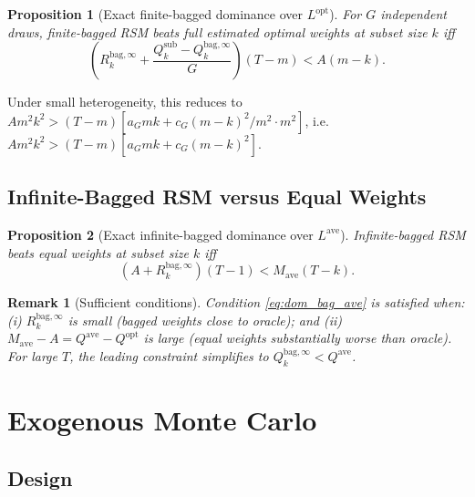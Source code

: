 \documentclass[12pt,a4paper]{article}
\newtheorem{proposition}{Proposition}
\newtheorem{remark}{Remark}
\theoremstyle{definition}
\begin{document}
\begin{proposition}[Exact finite-bagged dominance over $L^{\mathrm{opt}}$]
For $G$ independent draws, finite-bagged RSM beats full estimated optimal
weights at subset size $k$ iff
\begin{equation}\label{eq:dom_bag_G_opt}
\left(R_k^{\mathrm{bag},\infty} + \frac{Q_k^{\mathrm{sub}}-Q_k^{\mathrm{bag},\infty}}{G}\right)(T-m) < A(m-k).
\end{equation}
\end{proposition}

Under small heterogeneity, this reduces to $Am^2k^2>(T-m)[a_Gmk+c_G(m-k)^2/m^2\cdot m^2]$,
i.e.\ $Am^2k^2>(T-m)[a_Gmk+c_G(m-k)^2]$.

\subsection{Infinite-Bagged RSM versus Equal Weights}

\begin{proposition}[Exact infinite-bagged dominance over $L^{\mathrm{ave}}$]
Infinite-bagged RSM beats equal weights at subset size $k$ iff
\begin{equation}\label{eq:dom_bag_ave}
(A+R_k^{\mathrm{bag},\infty})(T-1) < M_{\mathrm{ave}}(T-k).
\end{equation}
\end{proposition}

\begin{remark}[Sufficient conditions]
Condition \eqref{eq:dom_bag_ave} is satisfied when:
(i) $R_k^{\mathrm{bag},\infty}$ is small (bagged weights close to oracle); and
(ii) $M_{\mathrm{ave}}-A=Q^{\mathrm{ave}}-Q^{\mathrm{opt}}$ is large (equal
weights substantially worse than oracle).
For large $T$, the leading constraint simplifies to
$Q_k^{\mathrm{bag},\infty}<Q^{\mathrm{ave}}$.
\end{remark}

\section{Exogenous Monte Carlo}
\label{sec:exomc}

\subsection{Design}
\end{document}
